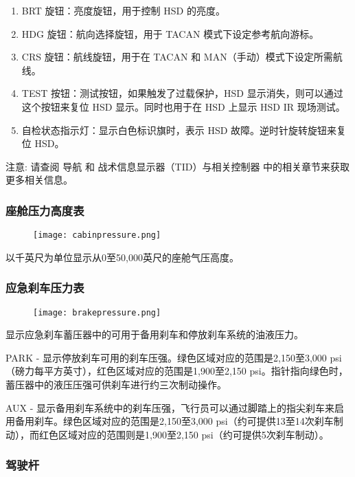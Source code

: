\begin{enumerate}
  \item BRT 旋钮：亮度旋钮，用于控制 HSD 的亮度。
  \item HDG 旋钮：航向选择旋钮，用于 TACAN 模式下设定参考航向游标。
  \item CRS 旋钮：航线旋钮，用于在 TACAN 和 MAN（手动）模式下设定所需航线。
  \item TEST 按钮：测试按钮，如果触发了过载保护，HSD 显示消失，则可以通过这个按钮来复位 HSD 显示。同时也用于在 HSD 上显示 HSD IR 现场测试。
  \item 自检状态指示灯：显示白色标识旗时，表示 HSD 故障。逆时针旋转旋钮来复位 HSD。
\end{enumerate}

注意:	请查阅 导航 和 战术信息显示器（TID）与相关控制器 中的相关章节来获取更多相关信息。

\subsubsection{座舱压力高度表}

\begin{figure}[htb]
  \center
  \texttt{[image: cabinpressure.png]}
\end{figure}
以千英尺为单位显示从0至50,000英尺的座舱气压高度。

\subsubsection{应急刹车压力表}

\begin{figure}[htb]
  \center
  \texttt{[image: brakepressure.png]}
\end{figure}
显示应急刹车蓄压器中的可用于备用刹车和停放刹车系统的油液压力。

PARK - 显示停放刹车可用的刹车压强。绿色区域对应的范围是2,150至3,000 psi（磅力每平方英寸），红色区域对应的范围是1,900至2,150 psi。指针指向绿色时，蓄压器中的液压压强可供刹车进行约三次制动操作。

AUX - 显示备用刹车系统中的刹车压强，飞行员可以通过脚踏上的指尖刹车来启用备用刹车。绿色区域对应的范围是2,150至3,000 psi（约可提供13至14次刹车制动），而红色区域对应的范围则是1,900至2,150 psi（约可提供5次刹车制动）。

\subsubsection{驾驶杆}

